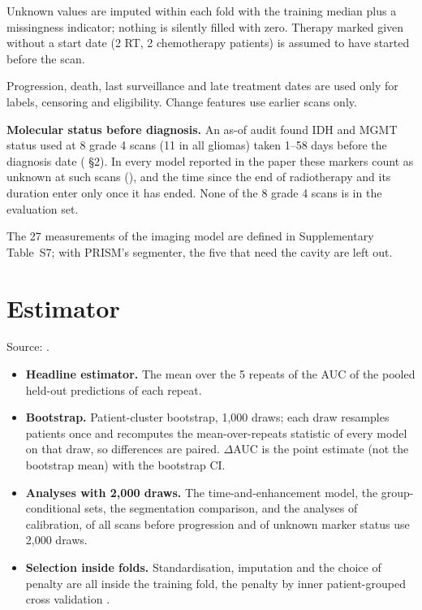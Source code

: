 \documentclass[11pt,a4paper]{article}
\begin{document}
Unknown values are imputed within each fold with the training median plus a missingness indicator; nothing is
silently filled with zero. Therapy marked given without a start date (2 RT, 2 chemotherapy patients) is assumed to
have started before the scan.

Progression, death, last surveillance and late treatment dates are used only for labels, censoring and
eligibility. Change features use earlier scans only.

\textbf{Molecular status before diagnosis.} An as-of audit found IDH and MGMT status used at
8 grade 4 scans (11 in all gliomas) taken 1--58 days before the diagnosis date ( \S{}2). In
every model reported in the paper these markers count as unknown at such scans (),
and the time since the end of radiotherapy and its duration enter only once it has ended. None of the 8 grade 4 scans
is in the evaluation set.

The 27 measurements of the imaging model are defined in Supplementary Table~S7; with PRISM's segmenter, the five that need the cavity are left out.

\FloatBarrier
\section{Estimator}\label{sec:S9}

Source: .

\begin{itemize}
\item \textbf{Headline estimator.} The mean over the 5 repeats of the AUC of the pooled held-out
predictions of each repeat.
\item \textbf{Bootstrap.} Patient-cluster bootstrap, 1,000 draws; each draw resamples patients once and
recomputes the mean-over-repeats statistic of every model on that draw, so differences are paired. $\Delta$AUC
is the point estimate (not the bootstrap mean) with the bootstrap CI.
\item \textbf{Analyses with 2,000 draws.} The time-and-enhancement model, the group-conditional sets,
the segmentation comparison, and the analyses of calibration, of all scans before progression and of unknown marker
status use 2,000 draws.
\item \textbf{Selection inside folds.} Standardisation, imputation and the choice of penalty are all inside the
training fold, the penalty by inner patient-grouped cross validation
\citep{varma2006,cawley2010,demircioglu2021}.
\end{itemize}
\end{document}
